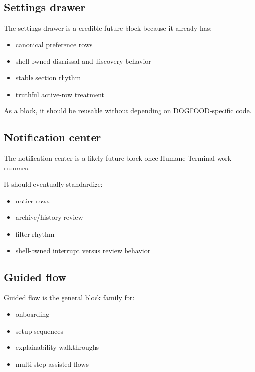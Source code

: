 \subsection{Settings drawer}\label{record-018-settings-drawer}

The settings drawer is a credible future block because it already has:

\begin{itemize}
\tightlist
\item
  canonical preference rows
\item
  shell-owned dismissal and discovery behavior
\item
  stable section rhythm
\item
  truthful active-row treatment
\end{itemize}

As a block, it should be reusable without depending on DOGFOOD-specific code.

\subsection{Notification center}\label{record-018-notification-center}

The notification center is a likely future block once Humane Terminal work resumes.

It should eventually standardize:

\begin{itemize}
\tightlist
\item
  notice rows
\item
  archive/history review
\item
  filter rhythm
\item
  shell-owned interrupt versus review behavior
\end{itemize}

\subsection{Guided flow}\label{record-018-guided-flow}

Guided flow is the general block family for:

\begin{itemize}
\tightlist
\item
  onboarding
\item
  setup sequences
\item
  explainability walkthroughs
\item
  multi-step assisted flows
\end{itemize}

